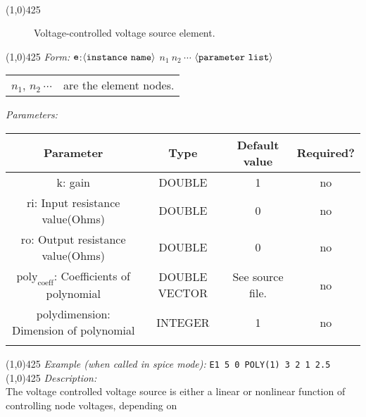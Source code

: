 \documentclass{article}
\begin{document}
\\
\hrulefill \linethickness{0.5mm}\line(1,0){425}
\normalsize
\newline
\begin{figure}[h]
\centerline{\epsfxsize=2.5in}
\caption{Voltage-controlled voltage source element.}
\end{figure}
\newline
\linethickness{0.5mm} \line(1,0){425}
\newline
\textit{Form:}
\newline
$\tt e$:$\langle \tt{instance\ name}\rangle$ $n_1\ n_2\ \cdots$
$\langle \tt{parameter\ list}\rangle$
\newline
\begin{tabular}{r l}
$n_1$, $n_2\ \cdots$ & are the element nodes. \\
\end{tabular}
\newline
\textit{Parameters:}
\begin{table}[H]
\begin{tabular}{|c|c|c|c|}
\hline
Parameter&Type&Default value&Required?\\
\hline
k: gain & DOUBLE & 1 & no\\
\hline
ri: Input resistance value(Ohms) & DOUBLE & 0 & no\\
\hline
ro: Output resistance value(Ohms) & DOUBLE & 0 & no\\
\hline $\mathrm{poly_{coeff}}$: Coefficients of polynomial &
DOUBLE VECTOR
& See source file. & no\\
\hline
polydimension: Dimension of polynomial & INTEGER & 1 & no\\
\par
\hline
\end{tabular}
\end{table}
\noindent\linethickness{0.5mm} \line(1,0){425}
\newline
\textit{Example (when called in spice mode):}
\newline
\texttt{E1\ 5\ 0\ POLY(1)\ 3\ 2\ 1\ 2.5}
\newline
\linethickness{0.5mm} \line(1,0){425}
\newline
\textit{Description:}\\
The voltage controlled voltage source is either a linear or
nonlinear function of controlling node voltages, depending on
\end{document}
